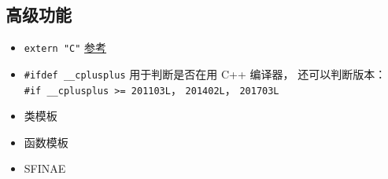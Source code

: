 \subsection{高级功能}
\begin{itemize}
\item \verb|extern "C"| \href{https://www.geeksforgeeks.org/extern-c-in-c/}{参考}
\item \verb|#ifdef __cplusplus| 用于判断是否在用 C++ 编译器， 还可以判断版本： \verb|#if __cplusplus >= 201103L|， \verb|201402L|， \verb|201703L|
\item 类模板
\item 函数模板
\item SFINAE
\end{itemize}
